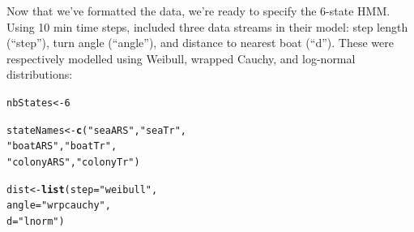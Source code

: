 \documentclass[12pt]{article}\usepackage[]{graphicx}\usepackage[]{xcolor}
\makeatletter
\newcommand{\hlnum}[1]{\textcolor[rgb]{0.686,0.059,0.569}{#1}}%
\newcommand{\hlsng}[1]{\textcolor[rgb]{0.192,0.494,0.8}{#1}}%
\newcommand{\hldef}[1]{\textcolor[rgb]{0.345,0.345,0.345}{#1}}%
\newcommand{\hlkwb}[1]{\textcolor[rgb]{0.69,0.353,0.396}{#1}}%
\newcommand{\hlkwc}[1]{\textcolor[rgb]{0.333,0.667,0.333}{#1}}%
\newcommand{\hlkwd}[1]{\textcolor[rgb]{0.737,0.353,0.396}{\textbf{#1}}}%
\newenvironment{kframe}{%
 \def\at@end@of@kframe{}%
 \ifinner\ifhmode%
  \def\at@end@of@kframe{\end{minipage}}%
  \begin{minipage}{\columnwidth}%
 \fi\fi%
 \def\FrameCommand##1{\hskip\@totalleftmargin \hskip-\fboxsep
 \colorbox{shadecolor}{##1}\hskip-\fboxsep
     \hskip-\linewidth \hskip-\@totalleftmargin \hskip\columnwidth}%
 \MakeFramed {\advance\hsize-\width
   \@totalleftmargin\z@ \linewidth\hsize
   \@setminipage}}%
 {\par\unskip\endMakeFramed%
 \at@end@of@kframe}
\newenvironment{knitrout}{}{} %
\makeatother
\begin{document}
Now that we've formatted the data, we're ready to specify the 6-state HMM. Using 10 min time steps, \cite{PirottaEtAl2018} included three data streams in their model: step length (``step''), turn angle (``angle''), and distance to nearest boat (``d'').  These were respectively modelled using Weibull, wrapped Cauchy, and log-normal distributions:
\begin{knitrout}
\color{fgcolor}\begin{kframe}
\begin{alltt}
\hldef{nbStates} \hlkwb{<-} \hlnum{6}

\hldef{stateNames} \hlkwb{<-} \hlkwd{c}\hldef{(}\hlsng{"seaARS"}\hldef{,} \hlsng{"seaTr"}\hldef{,}
                \hlsng{"boatARS"}\hldef{,} \hlsng{"boatTr"}\hldef{,}
                \hlsng{"colonyARS"}\hldef{,} \hlsng{"colonyTr"}\hldef{)}

\hldef{dist} \hlkwb{<-} \hlkwd{list}\hldef{(}\hlkwc{step} \hldef{=} \hlsng{"weibull"}\hldef{,}
             \hlkwc{angle} \hldef{=} \hlsng{"wrpcauchy"}\hldef{,}
             \hlkwc{d} \hldef{=} \hlsng{"lnorm"}\hldef{)}
\end{alltt}
\end{kframe}
\end{knitrout}
\end{document}
